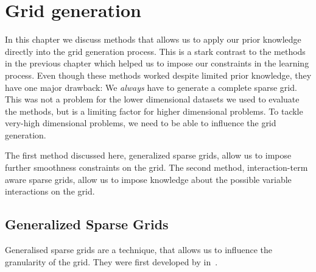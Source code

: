 \chapter{Grid generation}\label{cha:grid-gen}
In this chapter we discuss methods that allows us to apply our prior knowledge directly into the grid generation process.
This is a stark contrast to the methods in the previous chapter which helped us
to impose our constraints in the learning process.
Even though these methods worked despite limited prior knowledge, they have
one major drawback:
We \emph{always} have to generate a complete sparse grid.
This was not a problem for the lower dimensional datasets we used to evaluate
the methods, but is a limiting factor for higher dimensional problems.
To tackle very-high dimensional problems, we need to be able to influence the
grid generation.

The first method discussed here, generalized sparse grids, allow us to impose
further smoothness constraints on the grid.
The second method, interaction-term aware sparse grids, allow us to impose
knowledge about the possible variable interactions on the grid.

\section{Generalized Sparse Grids}\label{sec:generalised-sg}
Generalised sparse grids are a technique, that allows us to influence the
granularity of the grid.
They were first developed by \citeauthor{optimizedApproxSpaces} in~\cite{optimizedApproxSpaces}.

